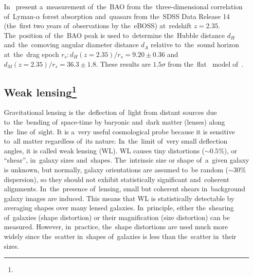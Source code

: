 In~\textcite{BAO_results} present a~measurement of~the~BAO from the~three-dimensional correlation of~Lyman-$\alpha$ forest absorption and~quasars from the~SDSS Data Release 14 (the~first two years of~observations by the~eBOSS) at~redshift $z=2.35$. The~position of~the~BAO peak is used to~determine the~Hubble distance $d_H$ and~the~comoving angular diameter distance $d_A$ relative to~the~sound horizon at~the~drag epoch $r_s: d_H(z=2.35)/r_s = 9.20\pm0.36$ and~$d_M(z=2.35)/r_s = 36.3\pm1.8$. These results are $1.5\sigma$ from the~flat \LCDM\ model of~\textcite{2016A&A...594A..13P}.
\DIFdelbegin %
\DIFdelend \DIFaddbegin \subsection[Weak lensing]{\DIFaddend Weak lensing\DIFaddbegin \footnote{}\DIFaddend }
\DIFaddbegin \label{ssec:wl}
\DIFaddend Gravitational lensing is the~deflection of~light from distant sources due to~the~bending of~space-time by baryonic and~dark matter (lenses) along the~line of~sight. It is a~very useful cosmological probe because it is sensitive to~all matter regardless of~its nature. In~the~limit of~very small deflection angles, it is called weak lensing (WL). WL causes tiny distortions ($\sim0.5\%$), or ``shear'', in~galaxy sizes and~shapes. The~intrinsic size or shape of~a~given galaxy is unknown, but normally, galaxy orientations are assumed to~be random ($\sim30\%$ dispersion), so they should not exhibit statistically significant and~coherent alignments. In~the~presence of~lensing, small but coherent shears in~background galaxy images are induced. This means that WL is statistically detectable by averaging shapes over many lensed galaxies. In~principle, either the~shearing of~galaxies (shape distortion) or their magnification (size distortion) can be measured. However, in~practice, the~shape distortions are used much more widely since the~scatter in~shapes of~galaxies is less than the~scatter in~their sizes.


